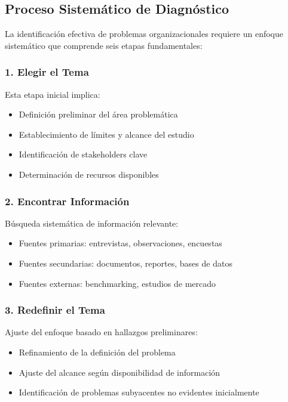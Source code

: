 \documentclass[12pt,letterpaper,oneside]{book}
\begin{document}
\subsection{Proceso Sistemático de Diagnóstico}

La identificación efectiva de problemas organizacionales requiere un enfoque sistemático que comprende seis etapas fundamentales:

\subsubsection{1. Elegir el Tema}

Esta etapa inicial implica:
\begin{itemize}
\item Definición preliminar del área problemática
\item Establecimiento de límites y alcance del estudio
\item Identificación de stakeholders clave
\item Determinación de recursos disponibles
\end{itemize}

\subsubsection{2. Encontrar Información}

Búsqueda sistemática de información relevante:
\begin{itemize}
\item Fuentes primarias: entrevistas, observaciones, encuestas
\item Fuentes secundarias: documentos, reportes, bases de datos
\item Fuentes externas: benchmarking, estudios de mercado
\end{itemize}

\subsubsection{3. Redefinir el Tema}

Ajuste del enfoque basado en hallazgos preliminares:
\begin{itemize}
\item Refinamiento de la definición del problema
\item Ajuste del alcance según disponibilidad de información
\item Identificación de problemas subyacentes no evidentes inicialmente
\end{itemize}
\end{document}

